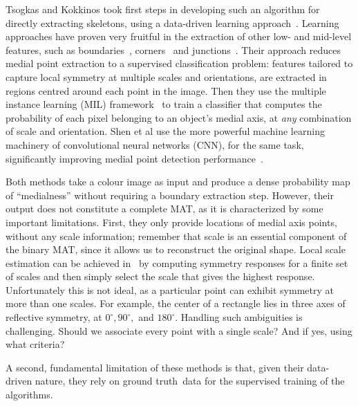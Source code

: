 \documentclass{article}
\def\groundtruth{ground truth}
\begin{document}
Tsogkas and Kokkinos took first steps in developing such an algorithm for directly extracting skeletons, using a data-driven learning approach~\cite{tsogkas2012learning}.
Learning approaches have proven very fruitful in the extraction of other low- and mid-level features, such as boundaries~\cite{konishi2003statistical,martin2004learning}, corners~\cite{rosten2006machine} and junctions~\cite{apostoloff2005learning,maire2008using}.
Their approach reduces medial point extraction to a supervised classification problem: 
features tailored to capture local symmetry at multiple scales and orientations, are extracted in regions centred around each point in the image. 
Then they use the multiple instance learning (MIL) framework~\cite{keeler1990integrated,dietterich1997solving}
to train a classifier that computes the probability of each pixel belonging to an object's medial axis, at \emph{any} combination of scale and orientation.  
Shen et al use the more powerful machine learning machinery of convolutional neural networks (CNN), for the same task, significantly improving medial point detection performance~\cite{shen2016object}.

Both methods take a colour image as input and produce a dense probability map of ``medialness'' without requiring a
boundary extraction step.
However, their output does not constitute a complete MAT, as it is characterized by some important limitations.
First, they only provide locations of medial axis points, without any scale information;
remember that scale is an essential component of the binary MAT, since it allows us to reconstruct the original shape.
Local scale estimation can be achieved in~\cite{tsogkas2012learning,shen2016object} by computing symmetry responses
for a finite set of scales and then simply select the scale that gives the highest response.
Unfortunately this is not ideal, as a particular point can exhibit symmetry at more than one scales. 
For example, the center of a rectangle lies in three axes of reflective symmetry, at $0^\circ, 90^\circ,$ and $180^\circ$. 
Handling such ambiguities is challenging. Should we associate every point with a single scale? 
And if yes, using what criteria?

A second, fundamental limitation of these methods is that, given their data-driven nature, they rely on 
\groundtruth\ data for the supervised training of the algorithms.
\end{document}
